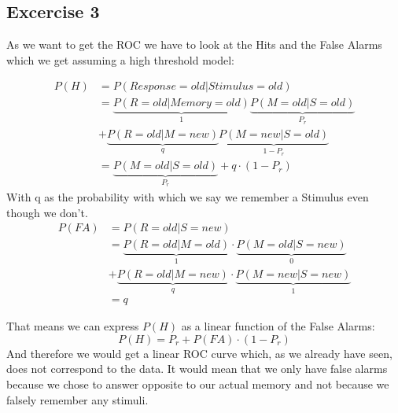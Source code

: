 \documentclass[../main/Notes.tex]{subfiles}
\begin{document}
\subsection*{Excercise 3}

As we want to get the ROC we have to look at the Hits and the False Alarms which we get assuming a high threshold model:

\begin{align*}
  P\left(H\right) &= P\left(Response=old|Stimulus=old\right)\\
  &= \underbrace{P\left(R=old|Memory=old\right)}_{1} \underbrace{P\left(M=old|S=old\right)}_{P_r} \\
  &+ \underbrace{P\left(R=old|M=new\right)}_q \underbrace{P\left(M=new|S=old\right)}_{1-P_r}      \\
  &= \underbrace{P\left(M=old|S=old\right)}_{P_r} + q\cdot\left(1-P_r\right)
\end{align*}
With q as the probability with which we say we remember a Stimulus even though we don't.
\begin{align*}
  P\left(FA\right)&= P\left(R=old|S=new\right)\\
  &= \underbrace{P\left(R=old|M=old\right)}_{1} \cdot \underbrace{P\left(M=old|S=new\right)}_{0} \\
  &+ \underbrace{P\left(R=old|M=new\right)}_{q} \cdot \underbrace{P\left(M=new|S=new\right)}_{1} \\
  &= q
\end{align*}

That means we can express $P\left(H\right)$ as a linear function of the False Alarms:
\begin{equation}
  P\left(H\right) = P_r + P\left(FA\right) \cdot \left(1-P_r\right)
\end{equation}
And therefore we would get a linear ROC curve which, as we already have seen, does not correspond to the data. It would mean that we only have false alarms because we chose to answer opposite to our actual memory and not because we falsely remember any stimuli. 

\end{document}
